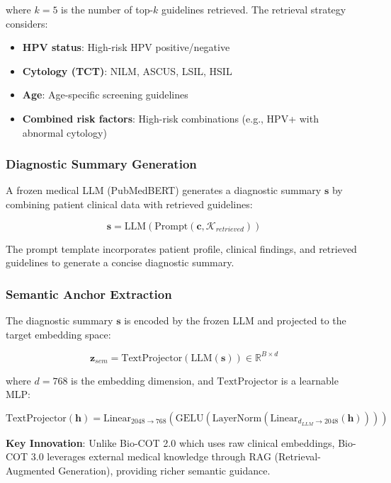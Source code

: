 \documentclass[11pt]{article}
\begin{document}
where $k=5$ is the number of top-$k$ guidelines retrieved. The retrieval strategy considers:
\begin{itemize}
\item \textbf{HPV status}: High-risk HPV positive/negative
\item \textbf{Cytology (TCT)}: NILM, ASCUS, LSIL, HSIL
\item \textbf{Age}: Age-specific screening guidelines
\item \textbf{Combined risk factors}: High-risk combinations (e.g., HPV+ with abnormal cytology)
\end{itemize}

\subsubsection{Diagnostic Summary Generation}

A frozen medical LLM (PubMedBERT) generates a diagnostic summary $\mathbf{s}$ by combining patient clinical data with retrieved guidelines:

\begin{equation}
\mathbf{s} = \text{LLM}(\text{Prompt}(\mathbf{c}, \mathcal{K}_{retrieved}))
\end{equation}

The prompt template incorporates patient profile, clinical findings, and retrieved guidelines to generate a concise diagnostic summary.

\subsubsection{Semantic Anchor Extraction}

The diagnostic summary $\mathbf{s}$ is encoded by the frozen LLM and projected to the target embedding space:

\begin{equation}
\mathbf{z}_{sem} = \text{TextProjector}(\text{LLM}(\mathbf{s})) \in \mathbb{R}^{B \times d}
\end{equation}

where $d=768$ is the embedding dimension, and $\text{TextProjector}$ is a learnable MLP:

\begin{equation}
\text{TextProjector}(\mathbf{h}) = \text{Linear}_{2048 \to 768}(\text{GELU}(\text{LayerNorm}(\text{Linear}_{d_{LLM} \to 2048}(\mathbf{h}))))
\end{equation}

\textbf{Key Innovation}: Unlike Bio-COT 2.0 which uses raw clinical embeddings, Bio-COT 3.0 leverages external medical knowledge through RAG (Retrieval-Augmented Generation), providing richer semantic guidance.
\end{document}
